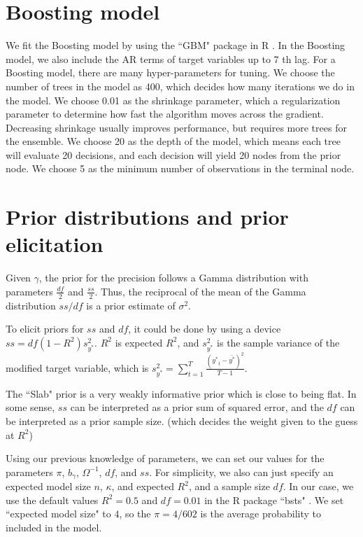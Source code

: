 \section{Boosting model}
\label{sec:boost}
We fit the Boosting model by using the ``GBM" package in R \cite{Ridgeway2015}. In the Boosting model, we also include the AR terms of target variables up to 7 th lag. For a Boosting model, there are many hyper-parameters for tuning. We choose the number of trees in the model as 400, which decides how many iterations we do in the model. We choose 0.01 as the shrinkage parameter, which a regularization parameter to determine how fast the algorithm moves across the gradient. Decreasing shrinkage usually improves performance, but requires more trees for the ensemble. We choose 20 as the depth of the model, which means each tree will evaluate 20 decisions, and each decision will yield 20 nodes from the  prior node. We choose 5 as the minimum number of observations in the terminal node.   

\section{Prior distributions and prior elicitation}
\label{sec:prior}


Given $\gamma$,  the prior for the precision follows a Gamma distribution with parameters $\frac{df}{2}$ and $\frac{ss}{2}$. Thus, the reciprocal of the mean of the Gamma distribution $ss/df$ is a prior estimate of $\sigma^2$. 


To elicit priors for $ss$ and $df$, it could be done by using a device $ss = df (1-R^2) s_{y^*}^2$. $R^2$ is expected $R^2$, and $s_{y^*}^2$ is the sample variance of the modified target variable, which is $s_{y^*}^2 = \sum_{t=1}^{T} \frac{({y^*}_t - \bar{y^*})^2}{T-1}$.  

The ``Slab" prior is a very weakly informative prior which is close to being flat. In some sense,  $ss$ can be interpreted as a prior sum of squared error, and the $df$ can be interpreted as a prior sample size. (which decides the weight given to the guess at $R^2$)

Using our previous knowledge of parameters, we can set our values for the parameters $\pi$, $b_{\gamma}$, $\Omega^{-1}$, $df$, and $ss$. For  simplicity, we also can just specify an expected model size $n$, $\kappa$, and expected $R^2$, and a sample size $df$. In our case, we use the default values $R^2 = 0.5$ and $df = 0.01$ in the R package ``bsts" \cite{Scott2015}. 
We set ``expected model size" to $4$, so the $\pi = 4/602$ is the average probability to included in the model.

